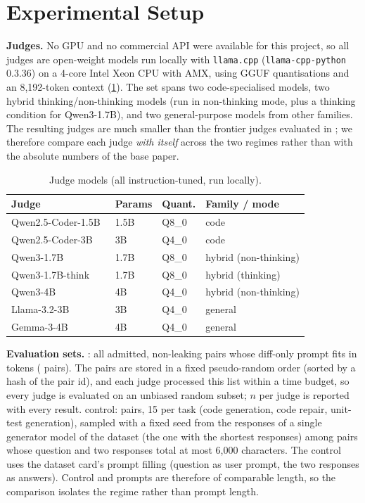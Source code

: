 \section{Experimental Setup}
\label{sec:experiments}

\textbf{Judges.}  No GPU and no commercial API were available for this project,
so all judges are open-weight models run locally with \texttt{llama.cpp}
(\texttt{llama-cpp-python} 0.3.36) on a 4-core Intel Xeon CPU with AMX, using
GGUF quantisations and an 8{,}192-token context (\cref{tab:judges}).  The set
spans two code-specialised models, two hybrid thinking/non-thinking models (run
in non-thinking mode, plus a thinking condition for Qwen3-1.7B), and two
general-purpose models from other families.  The resulting judges are much
smaller than the frontier judges evaluated in \CJB{}; we therefore compare each
judge \emph{with itself} across the two regimes rather than with the absolute
numbers of the base paper.

\begin{table}[t]
\caption{Judge models (all instruction-tuned, run locally).}
\label{tab:judges}
\centering
\footnotesize
\begin{tabular}{@{}llll@{}}
\toprule
Judge & Params & Quant. & Family / mode \\
\midrule
Qwen2.5-Coder-1.5B~\cite{hui2024qwen25coder} & 1.5B & Q8\_0 & code \\
Qwen2.5-Coder-3B~\cite{hui2024qwen25coder} & 3B & Q4\_0 & code \\
Qwen3-1.7B~\cite{yang2025qwen3} & 1.7B & Q8\_0 & hybrid (non-thinking) \\
Qwen3-1.7B-think~\cite{yang2025qwen3} & 1.7B & Q8\_0 & hybrid (thinking) \\
Qwen3-4B~\cite{yang2025qwen3} & 4B & Q4\_0 & hybrid (non-thinking) \\
Llama-3.2-3B~\cite{grattafiori2024llama3} & 3B & Q4\_0 & general \\
Gemma-3-4B~\cite{gemma2025gemma3} & 4B & Q4\_0 & general \\
\bottomrule
\end{tabular}
\end{table}

\textbf{Evaluation sets.}  \RJB{}: all admitted, non-leaking pairs whose
diff-only prompt fits in \MaxPromptTokens{} tokens (\NPairsJudged{} pairs).
The pairs are stored in a fixed pseudo-random order (sorted by a hash of the
pair id), and each judge processed this list within a time budget, so every
judge is evaluated on an unbiased random subset; $n$ per judge is reported
with every result.
\CJB{} control: \NCJBPairs{} pairs, 15 per task (code generation, code repair,
unit-test generation), sampled with a fixed seed from the responses of a single generator model of the
dataset (the one with the shortest responses) among pairs whose question and two responses total at most 6{,}000 characters.  The control uses
the dataset card's prompt filling (question as user prompt, the two responses as
answers).  Control and \RJB{} prompts are therefore of comparable length, so the
comparison isolates the regime rather than prompt length.

